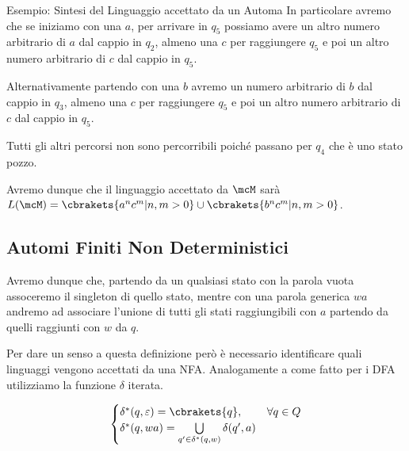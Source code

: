 \begin{generalbox}[colframe=azure-gradient-3!90!black]{Esempio: Sintesi del Linguaggio accettato da un Automa}
  In particolare avremo che se iniziamo con una \(a\), per arrivare in \(q_5\) possiamo avere un altro numero arbitrario di \(a\) dal cappio in \(q_2\), almeno una \(c\) per raggiungere \(q_5\) e poi un altro numero arbitrario di \(c\) dal cappio in \(q_5\).

  Alternativamente partendo con una \(b\) avremo un numero arbitrario di \(b\) dal cappio in \(q_3\), almeno una \(c\) per raggiungere \(q_5\) e poi un altro numero arbitrario di \(c\) dal cappio in \(q_5\).

  Tutti gli altri percorsi non sono percorribili poiché passano per \(q_4\) che è uno stato pozzo.

  Avremo dunque che il linguaggio accettato da \(\mcM\) sarà \(L(\mcM)=\cbrakets{a^{n}c^m\vert n,m >0} \cup \cbrakets{b^{n}c^m\vert n,m >0} \).
\end{generalbox}

\subsection{Automi Finiti Non Deterministici}


Avremo dunque che, partendo da un qualsiasi stato con la parola vuota assoceremo il singleton di quello stato, mentre con una parola generica \(wa\) andremo ad associare l'unione di tutti gli stati raggiungibili con \(a\) partendo da quelli raggiunti con \(w\) da \(q\).

Per dare un senso a questa definizione però è necessario identificare quali linguaggi vengono accettati da una NFA. Analogamente a come fatto per i DFA utilizziamo la funzione \(\delta\) iterata. %

\begin{equation}
  \begin{cases}
    \delta^*(q,\varepsilon)=\cbrakets{q}, & \forall q \in Q\\
    \delta^*(q,wa)=\bigcup\limits_{q' \in \delta^*(q,w)} \delta(q', a)
  \end{cases}
\end{equation}


